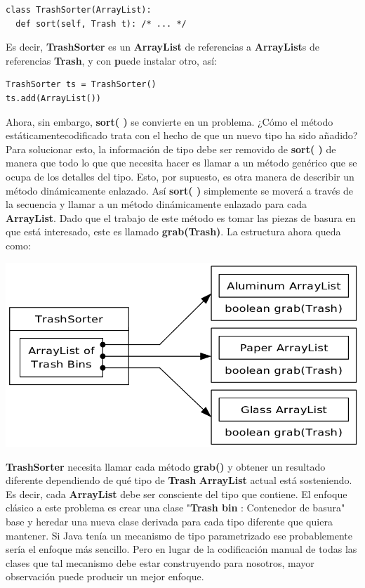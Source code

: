 \documentclass{article}
\begin{document}
\begin{lstlisting} 
class TrashSorter(ArrayList): 
  def sort(self, Trash t): /* ... */  
\end{lstlisting}

Es decir, \textbf{TrashSorter} es un \textbf{ArrayList} de referencias a \textbf{ArrayList}s de referencias \textbf{Trash}, y con \textbf puede instalar otro, así:  \newline

\begin{lstlisting} 
TrashSorter ts = TrashSorter() 
ts.add(ArrayList()) 
\end{lstlisting}

Ahora, sin embargo, \textbf{ sort( )} se convierte en un problema. ¿Cómo el método estáticamente\-codificado trata con el hecho de que un nuevo tipo ha sido añadido? Para solucionar esto, la información de tipo debe ser removido de \textbf{sort( )} de manera que todo lo que que necesita hacer es llamar a un método genérico que se ocupa de los detalles del tipo. Esto, por supuesto, es otra manera de describir un método dinámicamente enlazado. Así \textbf{sort( )} simplemente se moverá a través de la secuencia y llamar a un método dinámicamente enlazado para cada \textbf{ArrayList}. Dado que el trabajo de este método es tomar las piezas de basura en que está interesado, este es llamado \textbf{grab(Trash)}. La estructura ahora queda como:       \newline

\includegraphics[width=\textwidth]{Pagina148SinTraducir.png}

\textbf{TrashSorter} necesita llamar cada método \textbf{grab()} y obtener un resultado diferente dependiendo de qué tipo de \textbf{Trash} \textbf{ArrayList} actual está sosteniendo. Es decir, cada \textbf{ArrayList} debe ser consciente del tipo que contiene. El enfoque clásico a este problema es crear una clase "\textbf{Trash bin} : Contenedor de basura" base y heredar una nueva clase derivada para cada tipo diferente que quiera mantener. Si Java tenía un mecanismo de tipo parametrizado ese probablemente sería el enfoque más sencillo. Pero en lugar de la codificación manual de todas las clases que tal mecanismo debe estar construyendo para nosotros, mayor observación puede producir un mejor enfoque.   \newline
\end{document}

